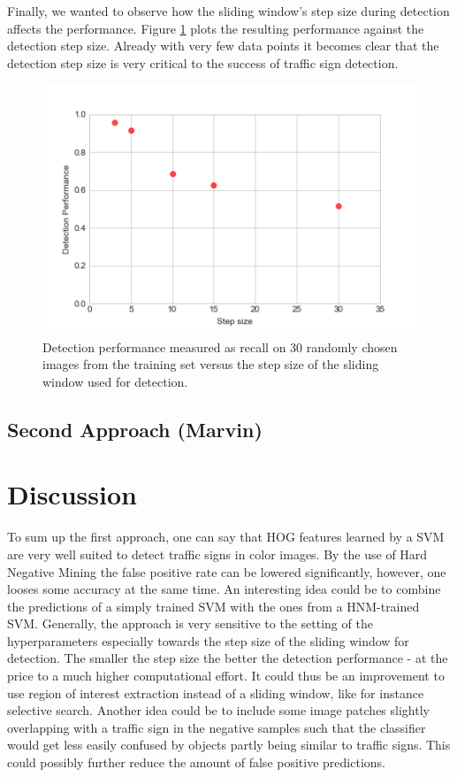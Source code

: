 \documentclass[12pt,a4paper,bibliography=totocnumbered,listof=totocnumbered]{scrartcl}
\begin{document}
Finally, we wanted to observe how the sliding window's step size during detection affects the performance. Figure \ref{fig:step_perf} plots the resulting performance against the detection step size. Already with very few data points it becomes clear that the detection step size is very critical to the success of traffic sign detection. 

\begin{figure}[H]
\centering
  \includegraphics[width=0.5\linewidth]{step_performance_jaccthres0-5}
  \caption{Detection performance measured as recall on 30 randomly chosen images from the training set versus the step size of the sliding window used for detection.}
  \label{fig:step_perf}
\end{figure}

\pagebreak
\subsection{Second Approach \small{(Marvin)}}

\pagebreak
\section{Discussion}
To sum up the first approach, one can say that HOG features learned by a SVM are very well suited to detect traffic signs in color images. By the use of Hard Negative Mining the false positive rate can be lowered significantly, however, one looses some accuracy at the same time. An interesting idea could be to combine the predictions of a simply trained SVM with the ones from a HNM-trained SVM. Generally, the approach is very sensitive to the setting of the hyperparameters especially towards the step size of the sliding window for detection. The smaller the step size the better the detection performance - at the price to a much higher computational effort. It could thus be an improvement to use region of interest extraction instead of a sliding window, like for instance selective search. Another idea could be to include some image patches slightly overlapping with a traffic sign in the negative samples such that the classifier would get less easily confused by objects partly being similar to traffic signs. This could possibly further reduce the amount of false positive predictions. \\
\end{document}
